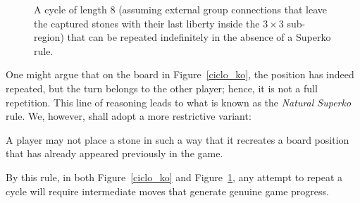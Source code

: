 \begin{figure}[H]
	\centering
	\begin{pgfgolayout}[columns = 5]
		\begin{goban}[3, name = t3x3]
		\end{goban}
		\begin{goban}[3, name = t3x3-1, resume = t3x3]
		\end{goban}
		\begin{goban}[3, name = t3x3-2, resume = {t3x3-1}]
		\end{goban}
		\begin{goban}[3, name = t3x3-3, resume = {t3x3-2}]
		\end{goban}
		\begin{goban}[3, name = t3x3-4, resume = {t3x3-3}]
		\end{goban}
		\begin{goban}[3, name = t3x3-5, resume = {t3x3-4}]
		\end{goban}
		\begin{goban}[3, name = t3x3-6, resume = t3x3-5]
		\end{goban}
		\begin{goban}[3, name = t3x3-7, resume = t3x3-6]
		\end{goban}
		\begin{goban}[3, name = t3x3-8, resume = t3x3-7]
		\end{goban}
	\end{pgfgolayout}
	\caption{A cycle of length 8 (assuming external group connections that leave the captured stones with their last liberty inside the $3\times 3$ sub-region) that can be repeated indefinitely in the absence of a Superko rule.}
	\label{ciclo_inf}
\end{figure}
One might argue that on the board in Figure~\ref{ciclo_ko}, the position has indeed repeated, but the turn belongs to the other player; hence, it is not a full repetition. This line of reasoning leads to what is known as the \textit{Natural Superko} rule. We, however, shall adopt a more restrictive variant:
\begin{definition}\label{sec-superko}
	A player may not place a stone in such a way that it recreates a board position that has already appeared previously in the game.
\end{definition}
By this rule, in both Figure~\ref{ciclo_ko} and Figure~\ref{ciclo_inf}, any attempt to repeat a cycle will require intermediate moves that generate genuine game progress.

